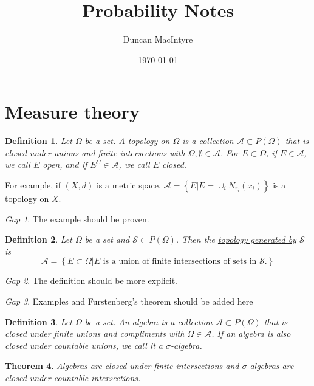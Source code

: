 \documentclass[11pt]{article}
\newcommand{\col}[1]{\mathscr{#1}}
\newcommand{\pset}[1]{P\left(#1\right)}
\newcommand{\defname}[1]{\underline{#1}}
\theoremstyle{theorem}
\newtheorem{theorem}{Theorem}[section]
\newtheorem{definition}[theorem]{Definition}
\theoremstyle{remark}
\theoremstyle{step}
\theoremstyle{gap}
\newtheorem*{gap}{Gap}
\begin{document}
\title{Probability Notes}
\author{Duncan MacIntyre}
\date{\today}
\maketitle
\tableofcontents
\bigskip
\newpage

\section{Measure theory}

\begin{definition}
Let \(\Omega\) be a set. A \defname{topology} on \(\Omega\) is a collection \(\col{A} \subset \pset{\Omega}\) that is closed under unions and finite intersections with \(\Omega, \emptyset \in \col{A}\). For \(E \subset \Omega\), if \(E \in \col{A}\), we call \(E\) open, and if \(E^C \in \col{A}\), we call \(E\) closed.
\end{definition}

For example, if \((X, d)\) is a metric space, \(\col{A} = \left\{E | E = \cup_i N_{r_i} \left(x_i\right)\right\}\) is a topology on \(X\).

\begin{gap} The example should be proven.\end{gap}

\begin{definition}
Let \(\Omega\) be a set and \(\col{S} \subset \pset{\Omega}\). Then the \defname{topology generated by} \(\col{S}\) is
\[\col{A} = \left\{E \subset \Omega | E \text{ is a union of finite intersections of sets in } \col{S}.\right\}\]
\end{definition}

\begin{gap} The definition should be more explicit.\end{gap}

\begin{gap} Examples and Furstenberg's theorem should be added here \end{gap}

\begin{definition}
Let \(\Omega\) be a set. An \defname{algebra} is a collection \(\col{A} \subset \pset{\Omega}\) that is closed under finite unions and compliments with \(\Omega \in \col{A}\). If an algebra is also closed under countable unions, we call it a \defname{\(\sigma\)-algebra}.
\end{definition}

\begin{theorem}
Algebras are closed under finite intersections and \(\sigma\)-algebras are closed under countable intersections.
\end{theorem}
\end{document}
